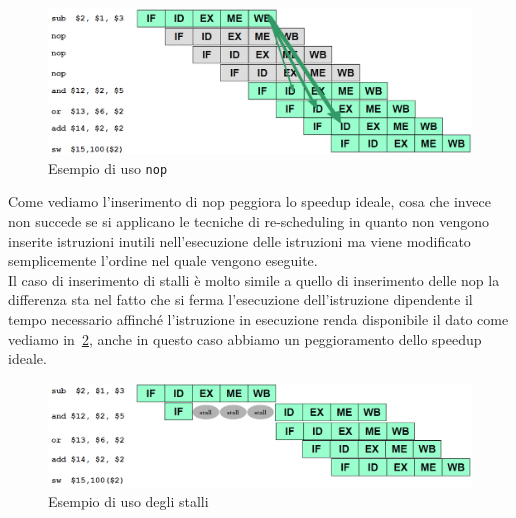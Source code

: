 \begin{figure}[htb]
\centering
\includegraphics[scale=0.45]{img/nop.png}
\caption{Esempio di uso \texttt{nop}}\label{fig:nop}
\end{figure}
Come vediamo l'inserimento di nop peggiora lo speedup ideale, cosa che invece non succede se si applicano le tecniche di re-scheduling in quanto non vengono inserite istruzioni inutili nell'esecuzione  delle istruzioni ma viene modificato semplicemente l'ordine nel quale vengono eseguite.\\
Il caso di inserimento di stalli è molto simile a quello di inserimento delle nop la differenza sta nel fatto che si ferma l'esecuzione dell'istruzione dipendente il tempo necessario affinché l'istruzione in esecuzione renda disponibile il dato come vediamo in \figurename\,\ref{fig:stall}, anche in questo caso abbiamo un peggioramento dello speedup ideale.
\begin{figure}[htb]
\centering
\includegraphics[scale=0.45]{img/stall.png}
\caption{Esempio di uso degli stalli}\label{fig:stall}
\end{figure}
